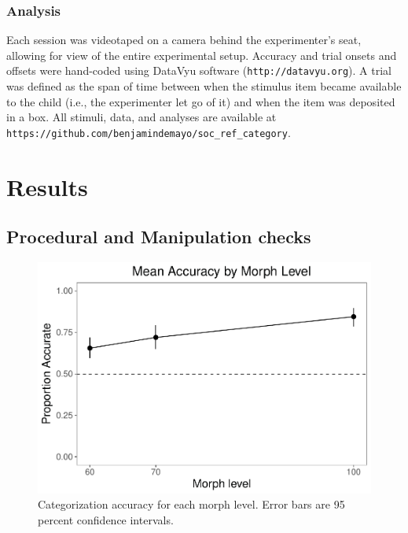 \documentclass[floatsintext,man]{apa6}
\theoremstyle{definition}
\theoremstyle{definition}
\theoremstyle{definition}
\theoremstyle{remark}
\begin{document}
\subsubsection{Analysis}\label{analysis}

Each session was videotaped on a camera behind the experimenter's seat,
allowing for view of the entire experimental setup. Accuracy and trial
onsets and offsets were hand-coded using DataVyu software
(\texttt{http://datavyu.org}). A trial was defined as the span of time
between when the stimulus item became available to the child (i.e., the
experimenter let go of it) and when the item was deposited in a box. All
stimuli, data, and analyses are available at
\texttt{https://github.com/benjamindemayo/soc\_ref\_category}.

\section{Results}\label{results}

\subsection{Procedural and Manipulation
checks}\label{procedural-and-manipulation-checks}

\begin{figure}
\centering
\includegraphics{soc_ref_category_paper_files/figure-latex/morphaccuracy-1.pdf}
\caption{\label{fig:morphaccuracy}Categorization accuracy for each morph
level. Error bars are 95 percent confidence intervals.}
\end{figure}
\end{document}
